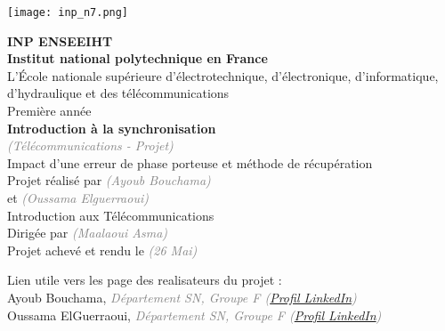 \documentclass[11pt]{article}
\newcommand{\Gray}[1]{\textcolor{gray}{\textit{#1}}}
\begin{document}
\pagestyle{fancy}
\fancyhf{} %
\renewcommand{\headrulewidth}{0.4pt} %
\fancyfoot[C]{\thepage} %
\renewcommand{\footrulewidth}{0.4pt} %


\hfill
\texttt{[image: inp\_n7.png]}

\vspace*{8mm}

\begin{center}
\LARGE
{\bfseries
INP ENSEEIHT\\[2mm]
Institut national polytechnique en France\\[3mm]
}
\large 
L'École nationale supérieure d'électrotechnique, d'électronique, d'informatique, d'hydraulique et des télécommunications \\[2mm]
Première année\\[10mm]
\Huge
{\bfseries Introduction à la synchronisation
}\\
\Gray{\LARGE (Télécommunications - Projet)}\\[6mm]
\huge 
Impact d'une erreur de phase porteuse et méthode de récupération\\[8mm]

\Large 
Projet réalisé par \Gray{(Ayoub Bouchama)} \\[1mm]
et \Gray{(Oussama Elguerraoui)} \\[6mm]
Introduction aux Télécommunications \\[6mm]
Dirigée par  \Gray{(Maalaoui Asma)}\\[8mm]
Projet achevé et rendu le \Gray{(26 Mai)}\\[10mm]

\end{center}

Lien utile vers les page des realisateurs du projet :\\[3mm]
Ayoub Bouchama, \Gray{Département SN, Groupe F (\href{https://www.linkedin.com/in/ayoubbouchama/}{Profil LinkedIn}) }\\
Oussama ElGuerraoui, \Gray{Département SN, Groupe F (\href{https://www.linkedin.com/in/oussama-elguerraoui-4770b51aa/}{Profil LinkedIn}) }\\

\newpage
\parskip 7pt
\end{document}
